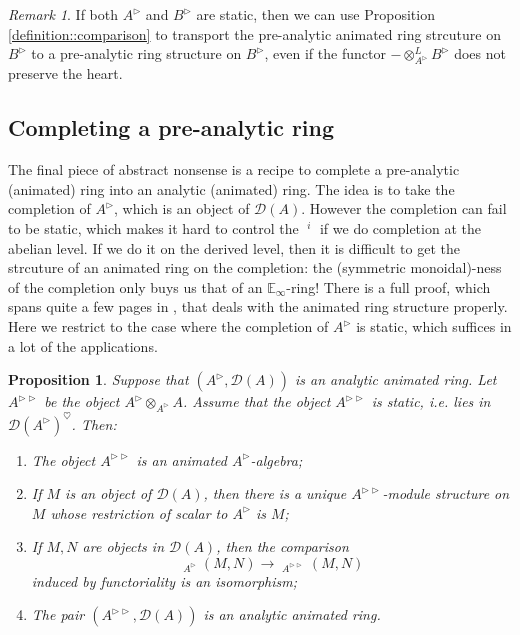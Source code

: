 \documentclass{article}
\theoremstyle{plain}
\newtheorem{prop}[thm]{Proposition}
\theoremstyle{definition}
\theoremstyle{remark}
\newtheorem{rmk}[thm]{Remark}
\DeclareMathOperator{\rhoms}{\underline{RHom}}
\DeclareMathOperator{\exts}{\underline{Ext}}
\newcommand{\dten}{\otimes ^{L}}
\newcommand{\huflag}{\triangleright}
\newcommand{\D}{\mathcal{D}}
\newcommand{\heart}{\heartsuit}
\begin{document}
\begin{rmk}
If both $ A ^{\huflag} $ and $ B ^{\huflag} $ are static, then we can use Proposition \ref{definition::comparison} to transport the
pre-analytic animated ring strcuture on $ B ^{\huflag} $ to a pre-analytic ring structure on $ B ^{\huflag} $,
even if the functor $ -\dten _{A ^{\huflag}}B ^{\huflag} $ does not preserve the heart.
\end{rmk}

\subsection{Completing a pre-analytic ring}

The final piece of abstract nonsense is a recipe to complete a pre-analytic (animated) ring into an analytic (animated) ring.
The idea is to take the completion of $ A ^{\huflag} $, which is an object of $ \D (A) $.
However the completion can fail to be static, which makes it hard to control the $ \exts ^{i} $ if we do completion at the abelian level.
If we do it on the derived level, then it is difficult to get the strcuture of an animated ring on the completion:
the (symmetric monoidal)-ness of the completion only buys us that of an $ \mathbb{E}_{\infty} $-ring!
There is a full proof, which spans quite a few pages in \cite{rodriguez-camargo_notes_nodate},
that deals with the animated ring structure properly.
Here we restrict to the case where the completion of $ A ^{\huflag} $ is static,
which suffices in a lot of the applications.
\begin{prop}
Suppose that $ (A ^{\huflag}, \D (A)) $ is an analytic animated ring.
Let $ A ^{\huflag\huflag} $ be the object $ A ^{\huflag} \otimes _{A ^{\huflag}} A $.
Assume that the object $ A ^{\huflag\huflag} $ is static, i.e. lies in $ \D (A ^{\huflag})^{\heart} $.
Then:
\begin{enumerate}
\item The object $ A ^{\huflag\huflag} $ is an animated $ A ^{\huflag} $-algebra;
\item If $ M $ is an object of $ \D (A) $, then there is a unique $ A ^{\huflag\huflag} $-module structure on $ M $
whose restriction of scalar to $ A ^{\huflag} $ is $ M $;
\item If $ M,N $ are objects in $ \D (A) $, then the comparison
\begin{equation*}
\rhoms _{A ^{\huflag}}(M, N) \to \rhoms _{A ^{\huflag\huflag}}(M, N)
\end{equation*}
induced by functoriality is an isomorphism;
\item The pair $ (A ^{\huflag\huflag}, \D (A)) $ is an analytic animated ring.
\end{enumerate}
\end{prop}
\end{document}

